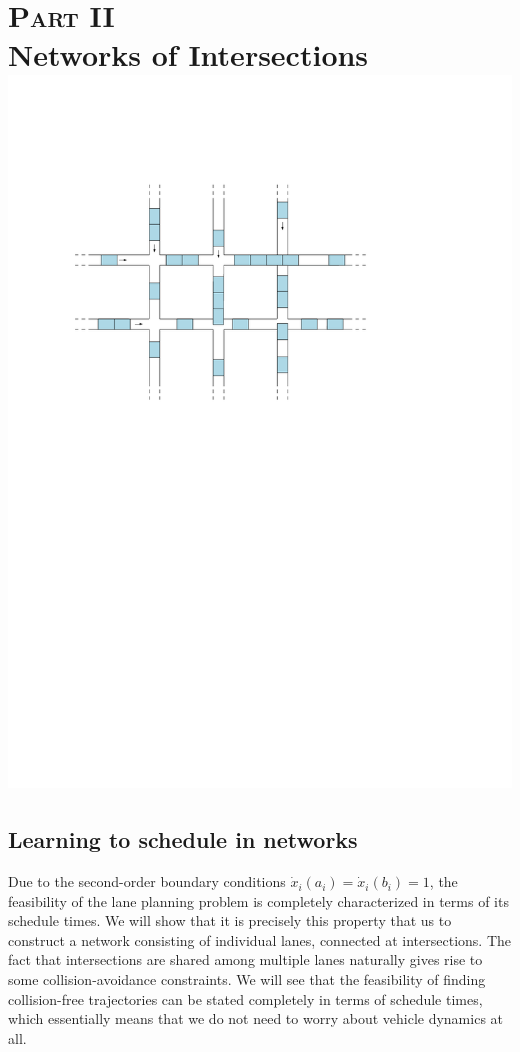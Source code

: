 \documentclass[a4paper]{report}
\theoremstyle{definition}
\theoremstyle{plain}
\begin{document}
\part*{\hspace{-0.8em}\textsc{Part II}\\[0.6em] Networks of Intersections\\[3em]
       \centering\includegraphics[scale=1]{figures/network-intersections}}

\chapter{Learning to schedule in networks}\label{chap:network-learning}

Due to the second-order boundary conditions
$\dot{x}_{i}(a_{i}) = \dot{x}_{i}(b_{i}) = 1$, the feasibility of the lane
planning problem is completely characterized in terms of its schedule times.
%
We will show that it is precisely this property that us to construct a network
consisting of individual lanes, connected at intersections.
%
The fact that intersections are shared among multiple lanes naturally gives rise to some collision-avoidance constraints.
%
We will see that the feasibility of finding collision-free trajectories can be
stated completely in terms of schedule times, which essentially means that we do
not need to worry about vehicle dynamics at all.
\end{document}
